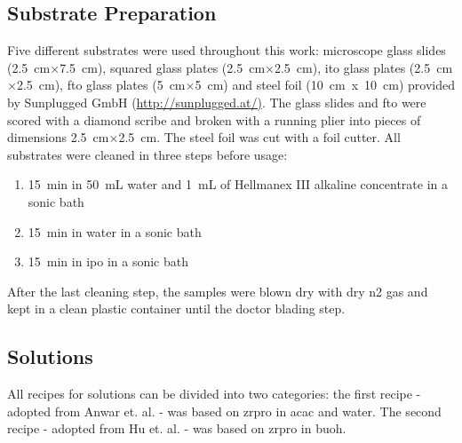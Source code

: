 \documentclass[a4paper]{article}
\newcommand{\td}[1]{\textbf{\textcolor{red}{#1}}}
\newcommand{\ds}[1]{}
\newcommand{\x}{$\times$}
\newcommand{\cm}[1]{\SI{#1}{\centi\meter}}
\newcommand{\ml}[1]{\SI{#1}{\milli\liter}}
\newcommand{\minutes}[1]{\SI{#1}{\minute}}
\begin{document}
\subsection{Substrate Preparation}
Five different substrates were used throughout this work: 
microscope glass slides (\cm{2.5}\x\cm{7.5})\ds{ from Sigma Aldrich},\ds{ thinner,} squared glass plates (\cm{2.5}\x\cm{2.5})\ds{ from Sigma Aldrich}, \gls{ito} glass plates (\cm{2.5}\x\cm{2.5})\ds{ from Sigma Aldrich}, \gls{fto} glass plates (\cm{5}\x\cm{5})\ds{ from Sigma Aldrich} and steel foil (10~cm~x~10~cm) provided by Sunplugged GmbH (\url{http://sunplugged.at/)}.
The glass slides and \gls{fto} were scored with a diamond scribe \ds{\td{(diamond scratcher/scraper)} }and broken with a running plier into pieces of dimensions \cm{2.5}\x\cm{2.5}.
The steel foil was cut with a foil cutter.
All substrates were cleaned in three steps before usage:
\begin{enumerate}
	\item \minutes{15} in \ml{50} \gls{water} and \ml{1} of Hellmanex III alkaline concentrate in a sonic bath
	\item \minutes{15} in \gls{water} in a sonic bath
	\item \minutes{15} in \gls{ipo} in a sonic bath 
\end{enumerate}
After the last cleaning step, the samples were blown dry with dry \gls{n2} gas and kept in a clean plastic container until the doctor blading step.

\subsection{Solutions}
All recipes for solutions can be divided into two categories:
the first recipe - adopted from Anwar et. al. \cite{Anwar2017} - was based on \gls{zrpro} in \gls{acac} and \gls{water}.
The second recipe - adopted from Hu et. al. \cite{Hu2016} - was based on \gls{zrpro} in \gls{buoh}.
\end{document}
